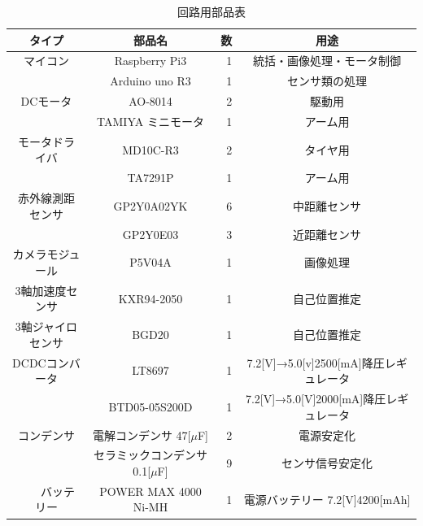 \documentclass[10pt,a4j]{jarticle}
\begin{document}
\begin{table}[t]
  \centering
  \caption{回路用部品表}
  \begin{tabular}{|c|c|r||c|} \hline
    タイプ & 部品名 & 数 & 用途 \\ \hline \hline
     マイコン & Raspberry Pi3 & 1& 統括・画像処理・モータ制御 \\ \cline{2-4}
   　　& Arduino uno R3& 1 & センサ類の処理 \\ \hline
     DCモータ & AO-8014 & 2 & 駆動用 \\ \cline{2-4}
      & TAMIYA ミニモータ & 1&アーム用  \\ \hline
    モータドライバ& MD10C-R3 & 2& タイヤ用 \\ \cline{2-4}
      &  TA7291P&1 &アーム用 \\ \hline
     赤外線測距センサ& GP2Y0A02YK &6&中距離センサ\\ \cline{2-4}
       &GP2Y0E03&3&近距離センサ \\ \hline
     カメラモジュール&P5V04A&1&画像処理\\ \hline
     3軸加速度センサ&KXR94-2050&1&自己位置推定\\ \hline
     3軸ジャイロセンサ&BGD20&1&自己位置推定\\ \hline
    DCDCコンバータ&LT8697&1& 7.2[V]→5.0[v]2500[mA]降圧レギュレータ\\ \cline{2-4}
       &BTD05-05S200D&1&7.2[V]→5.0[V]2000[mA]降圧レギュレータ\\ \hline
    コンデンサ&電解コンデンサ 47[$\mu$F]&2&電源安定化\\ \cline{2-4}
            &セラミックコンデンサ 0.1[$\mu$F]&9&センサ信号安定化\\ \hline
　　バッテリー&POWER MAX 4000 Ni-MH&1&電源バッテリー 7.2[V]4200[mAh]\\ \hline
                 
  \end{tabular}
  \label{tab:c_parts}
\end{table}
\end{document}
